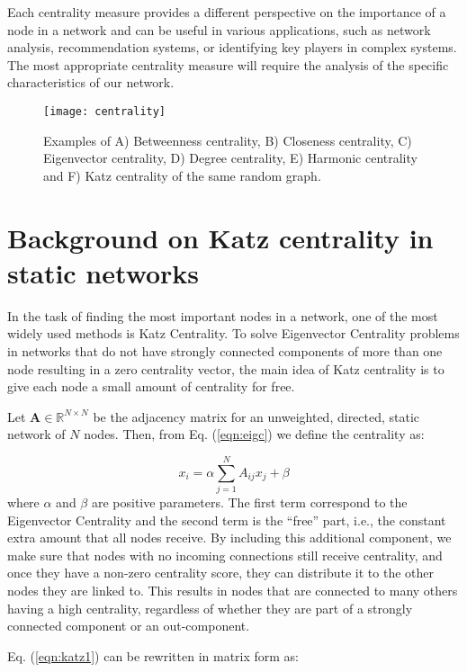 Each centrality measure provides a different perspective on the importance of a node in a network and can be useful in various applications, such as network analysis, recommendation systems, or identifying key players in complex systems. The most appropriate centrality measure will require the analysis of the specific characteristics of our network.

\begin{figure}[htbp]\centering
	\texttt{[image: centrality]}
	\caption{Examples of A) Betweenness centrality, B) Closeness centrality, C) Eigenvector centrality, D) Degree centrality, E) Harmonic centrality and F) Katz centrality of the same random graph.}
	\label{centrality}
	\bigskip
\end{figure}

\section{Background on Katz centrality in static networks}
\label{sec:back}
In the task of finding the most important nodes in a network, one of the most widely used methods is Katz Centrality. To solve Eigenvector Centrality problems in networks that do not have strongly connected components of more than one node resulting in a zero centrality vector, the main idea of Katz centrality is to give each node a small amount of centrality for free. 

Let $\mathbf{A}\in\mathbb{R}^{N\times N}$ be the adjacency matrix for an unweighted, directed, static network of $N$ nodes. Then, from Eq. (\ref{eqn:eigc}) we define the centrality as:

\begin{equation}
\label{eqn:katz1}
    x_i= \alpha\sum_{j=1}^{N}A_{ij}x_j + \beta
\end{equation}
where $\alpha$ and $\beta$ are positive parameters. The first term correspond to the Eigenvector Centrality and the second term is the “free” part, i.e., the constant extra amount that all nodes receive. By including this additional component, we make sure that nodes with no incoming connections still receive centrality, and once they have a non-zero centrality score, they can distribute it to the other nodes they are linked to. This results in nodes that are connected to many others having a high centrality, regardless of whether they are part of a strongly connected component or an out-component.

Eq. (\ref{eqn:katz1}) can be rewritten in matrix form as:

